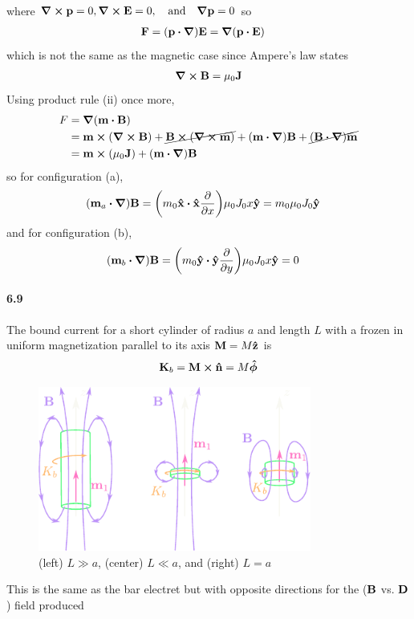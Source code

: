 \documentclass[../main.tex]{subfiles}
\begin{document}
\begin{itemize}
\begin{align*}
    \end{align*}
    where $\curl \vb p = 0, \curl \vb E = 0, \qand \grad \vb p = 0$ so
    \begin{align*}
        \vb F &= (\vb p \vdot \grad) \vb E = \grad (\vb p \vdot \vb E)
    \end{align*}
    which is not the same as the magnetic case since Ampere's law states
    \begin{align*}
        \curl \vb B = \mu_0 \vb J
    \end{align*}
    Using product rule (ii) once more,
    \begin{align*}
        F &= \grad (\vb m \vdot \vb B) \\
        &= \vb m \cross (\curl \vb B) + \cancel{\vb B \cross (\curl \vb m)} + (\vb m \vdot \grad) \vb B + \cancel{(\vb B \vdot \grad) \vb m} \\
        &= \vb m \cross (\mu_0 \vb J) + (\vb m \vdot \grad) \vb B
    \end{align*}
    so for configuration (a),
    \begin{align*}
        (\vb m_a \vdot \grad)\vb B &= \qt(m_0 \vu x \vdot \vu x \pdv{x}) \mu_0 J_0 x \vu y = m_0 \mu_0 J_0 \vu y
    \end{align*}
    and for configuration (b),
    \begin{align*}
        (\vb m_b \vdot \grad)\vb B &= \qt(m_0 \vu y \vdot \vu y \pdv{y}) \mu_0 J_0 x \vu y = 0
    \end{align*}
\end{itemize}

\newpage
\paragraph{6.9} The bound current for a short cylinder of radius $a$ and length $L$ with a frozen in
uniform magnetization parallel to its axis $\vb M = M \vu z$ is
\begin{align*}
    \vb K_b = \vb M \cross \vu n = M \vu*\phi
\end{align*}
\begin{figure}[ht]
    \centering
    \includegraphics[width=0.8\textwidth]{hw10_2.pdf}
    \caption{(left) $L \gg a$, (center) $L \ll a$, and (right) $L = a$}
    \label{fig:hw10_2}
\end{figure}
This is the same as the bar electret but with opposite directions for the ($\vb B$ vs. $\vb D$) field produced
\end{document}
